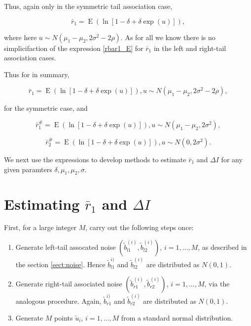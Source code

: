 \documentclass[letterpaper,11pt]{article}
\DeclareMathOperator{\EX}{E}%
\begin{document}
\noindent Thus, again only in the symmetric tail association case,

\begin{equation}
\bar r_1 = \EX(\ln[1-\delta+\delta \exp(u)]), \label{rbar1_E_usub}
\end{equation}

\noindent where here $u \sim N(\mu_1-\mu_2, 2\sigma^2-2\rho)$. As for all we know there is no simplicifaction of the expression \ref{rbar1_E}  for $\bar r_1$ in the left and right-tail association cases. 

Thus for in summary,

\begin{equation}
\bar r_1 = \EX(\ln[1-\delta+\delta \exp(u)]), u \sim N(\mu_1-\mu_2, 2\sigma^2-2\rho), \label{sym_rbar1}
\end{equation}

\noindent for the symmetric case, and 

\begin{equation}
\bar r_1^{\#} = \EX(\ln[1-\delta+\delta \exp(u)]), u \sim N(\mu_1-\mu_2, 2\sigma^2), \label{sym_rbar1sharp}
\end{equation}

\begin{equation}
\bar r_2^{\#} = \EX(\ln[1-\delta+\delta \exp(u)]), u \sim N(0, 2\sigma^2). \label{sym_rbar2sharp}
\end{equation}

\noindent We next use the expressions to develop methods to estimate $\bar r_1$ and $\Delta I$ for any given paramters $\delta,\mu_1,\mu_2,\sigma$.



\section{Estimating $\bar r_1$ and $\Delta I$}

First, for a large integer $M$, carry out the following steps once:

\begin{enumerate}
\item Generate left-tail assocated noise $(\tilde b_{l1}^{(i)}, \tilde b_{l2}^{(i)})$, $i=1,...,M$, as described in the section \ref{sect:noise}. Hence $\tilde b_{l1}^{i)}$ and $\tilde b_{l2}^{(i)}$ are distributed as $N(0,1)$. 
\item Generate right-tail associated noise $(\tilde b_{r1}^{(i)}, \tilde b_{r2}^{(i)})$, $i=1,...,M$, via the analogous procedure. Again, $\tilde b_{r1}^{i)}$ and $\tilde b_{r2}^{(i)}$ are distributed as $N(0,1)$. 
\item Generate $M$ points $\tilde u_i$, $i = 1,...,M$ from a standard normal distribution. 
\end{enumerate}
\end{document}
